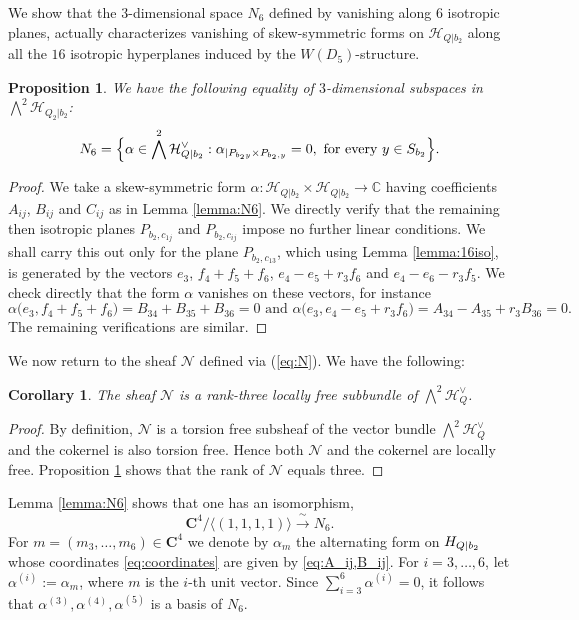 \documentclass[11pt]{amsart}
\newtheorem{proposition}[theorem]{Proposition}
\newtheorem{corollary}[theorem]{Corollary}
\theoremstyle{definition}
\def\cN{\mathcal{N}}
\def\cH{\mathcal{H}}
\begin{document}
We show that the $3$-dimensional space $N_6$ defined by vanishing along $6$ isotropic planes, actually characterizes vanishing of skew-symmetric forms on $\cH_{Q|b_2}$ along all the $16$ isotropic hyperplanes induced by the $W(D_5)$-structure.

\begin{proposition}\label{prop:6=16}
We have the following equality of $3$-dimensional subspaces in $\bigwedge^2 \cH_{Q_2|b_2}$:
$$N_6=\Bigl\{\alpha\in \bigwedge^2\cH_{Q|b_2}^{\vee}: \alpha_{|P_{b_2 y}\times P_{b_2,y}}=0, \mbox{ for every } y\in S_{b_2}\Bigr\}.$$
\end{proposition}
\begin{proof}
 We take a skew-symmetric form $\alpha\colon \cH_{Q|b_2}\times \cH_{Q|b_2}\rightarrow \mathbb C$ having coefficients $A_{ij}$, $B_{ij}$ and $C_{ij}$ as in Lemma \ref{lemma:N6}. We directly verify that the remaining then isotropic planes $P_{b_2, c_{1j}}$ and $P_{b_2, c_{ij}}$ impose no further linear conditions. We shall carry this out only for the 
 plane $P_{b_2, c_{13}}$, which using Lemma \ref{lemma:16iso}, is generated by the vectors $e_3$, $f_4+f_5+f_6$, $e_4-e_5+r_3f_6$ and $e_4-e_6-r_3f_5$. We check directly that the form $\alpha$ vanishes on these vectors, for instance 
 $$\alpha\bigl(e_3, f_4+f_5+f_6\bigr)=B_{34}+B_{35}+B_{36}=0 \mbox{ and } \alpha\bigl(e_3, e_4-e_5+r_3f_6\bigr)=A_{34}-A_{35}+r_3 B_{36}=0.$$
 The remaining verifications are similar.
\end{proof}

We now return to the sheaf $\cN$ defined via (\ref{eq:N}). We have the following:
\begin{corollary}  
\label{cor:rank-three}
The sheaf $\mathcal N$ is a rank-three locally free subbundle of
$\bigwedge^2\mathcal H_Q^\vee$. 
\end{corollary}
\begin{proof}
By definition, $\cN$ is a torsion free subsheaf of the vector bundle $\bigwedge^2 \cH_Q^{\vee}$ and the cokernel is also torsion free. Hence both $\mathcal N$ and the cokernel are locally free. Proposition \ref{prop:6=16} shows that the rank of $\mathcal N$ equals three.     
\end{proof}





Lemma \ref{lemma:N6} shows that one has an isomorphism, 
\begin{equation}\label{eq;N6_isom}
\mathbf C^4/\bigl\langle (1,1,1,1)\bigr \rangle \xrightarrow{\ \sim\ }N_6 .
\end{equation}
For $m=(m_3,\dots,m_6)\in\mathbf C^4$ we denote by $\alpha_m$ the alternating form on $\mathcal \cH_{Q|b_2}$ whose coordinates \eqref{eq:coordinates} are given by \eqref{eq:A_ij,B_ij}. 
For $i=3,\dots,6$, let $\alpha^{(i)}:=\alpha_m$, where $m$ is the $i$-th unit vector. Since $\sum_{i=3}^6 \alpha^{(i)}=0$, it follows that  
$\alpha^{(3)},\alpha^{(4)},\alpha^{(5)}$ is a basis of $N_6$.
\end{document}

